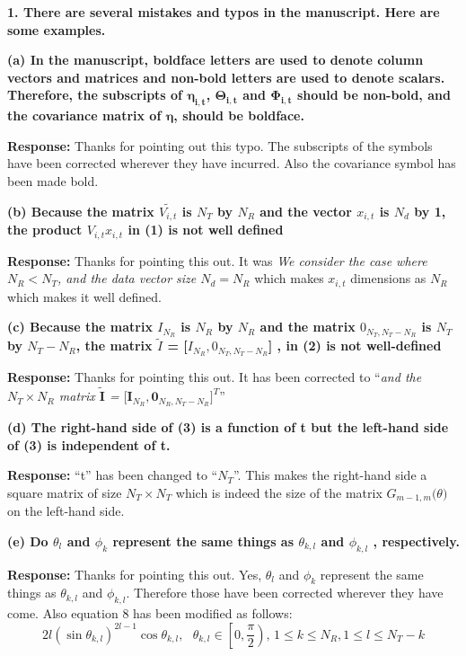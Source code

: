 \documentclass[12pt]{letter}
\begin{document}
\textbf{1. There are several mistakes and typos in the manuscript. Here are some examples.}

\textbf{(a) In the manuscript, boldface letters are used to denote column vectors and matrices and non-bold letters are used to denote scalars. Therefore, the subscripts of $\boldsymbol{\eta_{i,t}}$, $\boldsymbol{\Theta_{i,t}}$ and $\boldsymbol{\Phi_{i,t}}$ should be non-bold, and the covariance matrix of $\boldsymbol{\eta}$, should be boldface.}

\textbf{Response:} Thanks for pointing out this typo. The subscripts of the symbols have been corrected wherever they have incurred. Also the covariance symbol has been made bold.

\textbf{(b) Because the matrix $\tilde{V_{i,t}}$ is $N_T$ by $N_R$ and the vector $x_{i,t}$ is $N_d$ by 1, the product $V_{i,t}x_{i,t}$ in (1) is not well defined}

\textbf{Response:} Thanks for pointing this out. 
It was \emph{We consider the case where $N_R < N_T$, and the data vector size $N_d = N_R$}
which makes $x_{i,t}$ dimensions as $N_R$ which makes it well defined.

\textbf{(c) Because the matrix $I_{N_R}$ is $N_R$ by $N_R$ and the matrix $0_{N_T , N_T - N_R }$ is $N_T$ by $N_T - N_R$, the matrix $\tilde{I}$ = [$I_{N_R}, 0_{N_T, N_T - N_R }$] , in (2) is not well-defined}

\textbf{Response:} Thanks for pointing this out. 
It has been corrected to ``\emph{and the $N_T \times N_R$ matrix $\tilde{\textbf{I}}$ = $\big[\textbf{I}_{N_R }, {\boldsymbol{0}}_{N_R ,N_T -N_R}\big]^{T}$}''

\textbf{(d) The right-hand side of (3) is a function of t but the left-hand side of (3) is independent of t.}

\textbf{Response:} ``t'' has been changed to ``$N_T$''. This makes the right-hand side a square matrix of size $N_T \times N_T$
which is indeed the size of the matrix $G_{m-1,m}\big(\theta\big)$ on the left-hand side.

\textbf{(e) Do $\theta_l$ and $\phi_k$ represent the same things as $\theta_{k,l}$ and $\phi_{k,l}$ , respectively.}

\textbf{Response:} Thanks for pointing this out. Yes, $\theta_l$ and $\phi_k$ represent the same things as $\theta_{k,l}$ and $\phi_{k,l}$. Therefore those have been corrected wherever they have come. Also equation 8 has been modified as follows:
$$2l(\sin\theta_{k,l})^{2l-1}\cos\theta_{k,l}, \mbox{  }\theta_{k,l} \in \left[0, \frac{\pi}{2}\right) \mbox{, }1\leq k \leq N_R, 1\leq l 
\leq N_T -k$$
\end{document}
